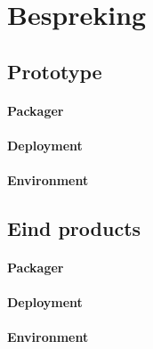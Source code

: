 \chapter{Bespreking}

\section{Prototype}

\subsubsection{Packager}
\subsubsection{Deployment}
\subsubsection{Environment}

\section{Eind products}

\subsubsection{Packager}
\subsubsection{Deployment}
\subsubsection{Environment}
